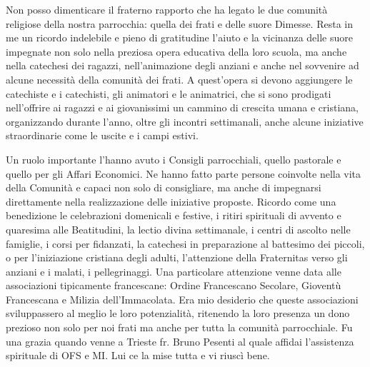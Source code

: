 Non posso dimenticare il fraterno rapporto che ha legato le due comunità religiose della nostra 
parrocchia: quella dei frati e delle suore Dimesse.
Resta in me un ricordo indelebile e pieno di gratitudine l’aiuto e la vicinanza delle suore 
impegnate non solo nella preziosa opera educativa della loro scuola, ma anche nella catechesi dei 
ragazzi, nell’animazione degli anziani e anche nel sovvenire ad alcune necessità della comunità 
dei frati. A quest’opera si devono aggiungere le catechiste e i catechisti, gli animatori e le 
animatrici, che si sono prodigati nell’offrire ai ragazzi e ai giovanissimi un cammino di crescita 
umana e cristiana, organizzando durante l’anno, oltre gli incontri settimanali, anche alcune 
iniziative straordinarie come le uscite e i campi estivi.

Un ruolo importante l’hanno avuto i Consigli parrocchiali, quello pastorale e quello per gli Affari 
Economici. Ne hanno fatto parte persone coinvolte nella vita della Comunità e capaci non solo di 
consigliare, ma anche di impegnarsi direttamente nella realizzazione delle iniziative proposte. 
Ricordo come una benedizione le celebrazioni domenicali e festive, i ritiri spirituali di avvento e 
quaresima alle Beatitudini, la lectio divina settimanale, i centri di ascolto nelle famiglie, i corsi 
per fidanzati, la catechesi in preparazione al battesimo dei piccoli, o per l’iniziazione cristiana 
degli adulti, l’attenzione della Fraternitas verso gli anziani e i malati, i pellegrinaggi.
Una particolare attenzione venne data alle associazioni tipicamente francescane: Ordine 
Francescano Secolare, Gioventù Francescana e Milizia dell’Immacolata. Era mio desiderio che 
queste associazioni sviluppassero al meglio le loro potenzialità, ritenendo la loro presenza un 
dono prezioso non solo per noi frati ma anche per tutta la comunità parrocchiale. Fu una grazia 
quando venne a Trieste fr. Bruno Pesenti al quale affidai l’assistenza spirituale di OFS e MI. Lui 
ce la mise tutta e vi riuscì bene.

